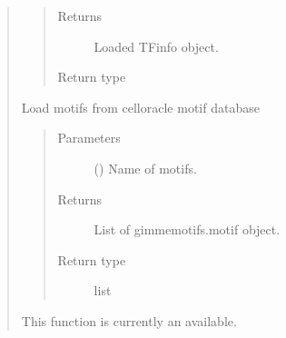 \documentclass[letterpaper,10pt,english]{sphinxmanual}
\begin{document}
\begin{quote}
\begin{fulllineitems}
\begin{quote}
\begin{description}
\item[{Returns}] \leavevmode
Loaded TFinfo object.

\item[{Return type}] \leavevmode
{\hyperref[\detokenize{modules/celloracle.motif_analysis:celloracle.motif_analysis.TFinfo}]{}}

\end{description}\end{quote}

\end{fulllineitems}


\begin{fulllineitems}
\label{\detokenize{modules/celloracle.motif_analysis:celloracle.motif_analysis.load_motifs}}
Load motifs from celloracle motif database
\begin{quote}\begin{description}
\item[{Parameters}] \leavevmode
{} () \textendash{} Name of motifs.

\item[{Returns}] \leavevmode
List of gimmemotifs.motif object.

\item[{Return type}] \leavevmode
list

\end{description}\end{quote}

\end{fulllineitems}


\begin{fulllineitems}
\label{\detokenize{modules/celloracle.motif_analysis:celloracle.motif_analysis.make_TFinfo_from_scanned_file}}
This function is currently an available.


\end{fulllineitems}
\end{quote}
\end{document}
